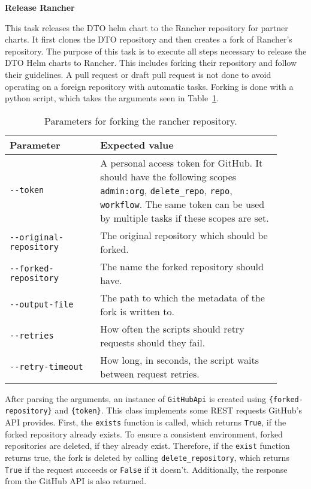 \textbf{Release Rancher}

This task releases the DTO helm chart to the Rancher repository for partner charts.
It first clones the DTO repository and then creates a fork of Rancher's repository.
The purpose of this task is to execute all steps necessary to release the DTO Helm charts to Rancher.
This includes forking their repository and follow their guidelines.
A pull request or draft pull request is not done to avoid operating on a foreign repository with automatic tasks.
Forking is done with a python script, which takes the arguments seen in Table~\ref{tab:parameters-for-forking-the-rancher-repository}.

\begin{table}[h]
    \centering
    \caption{Parameters for forking the rancher repository.}
    \label{tab:parameters-for-forking-the-rancher-repository}
    \begin{tabular}{p{0.3\linewidth}|p{0.6\linewidth}}
        Parameter & Expected value \\
        \hline
        \verb|--token| & A personal access token for GitHub.
            It should have the following scopes \verb|admin:org|, \verb|delete_repo|, \verb|repo|, \verb|workflow|.
            The same token can be used by multiple tasks if these scopes are set. \\
        \verb|--original-repository| & The original repository which should be forked. \\
        \verb|--forked-repository| & The name the forked repository should have. \\
        \verb|--output-file| & The path to which the metadata of the fork is written to. \\
        \verb|--retries| & How often the scripts should retry requests should they fail. \\
        \verb|--retry-timeout| & How long, in seconds, the script waits between request retries. \\
    \end{tabular}
\end{table}

\pagebreak

After parsing the arguments, an instance of \verb|GitHubApi| is created using \verb|{forked-repository}| and \verb|{token}|.
This class implements some REST requests GitHub's API provides.
First, the \verb|exists| function is called, which returns \verb|True|, if the forked repository already exists.
To ensure a consistent environment, forked repositories are deleted, if they already exist.
Therefore, if the \verb|exist| function returns true, the fork is deleted by calling \verb|delete_repository|, which returns \verb|True| if the request succeeds or \verb|False| if it doesn't.
Additionally, the response from the GitHub API is also returned.

